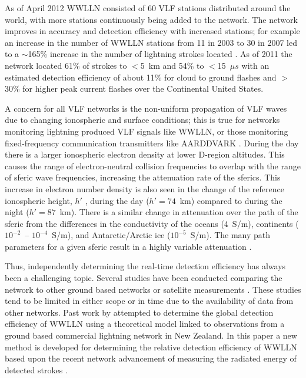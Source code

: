 \documentclass[draft,ras]{agutex}
\begin{document}
\begin{article}
As of April 2012 WWLLN consisted of 60 VLF stations distributed around the world, with more stations continuously being added to the network. The network improves in accuracy and detection efficiency with increased stations; for example an increase in the number of WWLLN stations from 11 in 2003 to 30 in 2007 led to a $\sim$165\% increase in the number of lightning strokes located \citep{Rodger2009}. As of 2011 the network located 61\% of strokes to $<$5~km and 54\% to $<$15~$\mu s$ with an estimated detection efficiency of about 11\% for cloud to ground flashes and $>$30\% for higher peak current flashes over the Continental United States\citep{Hutchins2012c, Abarca2010, Rodger2009}.

A concern for all VLF networks is the non-uniform propagation of VLF waves due to changing ionospheric  and surface conditions; this is true for networks monitoring lightning produced VLF signals like WWLLN, or those monitoring fixed-frequency communication transmitters like AARDDVARK \citep{Clilverd2009}. During the day there is a larger ionospheric electron density at lower D-region altitudes. This causes the range of electron-neutral collision frequencies to overlap with the range of sferic wave frequencies, increasing the attenuation rate of the sferics. This increase in electron number density is also seen in the change of the reference ionospheric height, $h'$ \citep{Wait1960a}, during the day ($h'=74$~km) compared to during the night ($h'=87$~km). There is a similar change in attenuation over the path of the sferic from the differences in the conductivity of the oceans (4~S/m), continents ($10^{-2}$~-- $10^{-4}$~S/m), and Antarctic/Arctic ice ($10^{-5}$~S/m). The many path parameters for a given sferic result in a highly variable attenuation \citep{Volland1995}.

Thus, independently determining the real-time detection efficiency has always been a challenging topic. Several studies have been conducted comparing the network to other ground based networks or satellite measurements \citep{Lay2004b, Jacobson2006c, Rodger2009, Abarca2010, Abreu2010}. These studies tend to be limited in either scope or in time due to the availability of data from other networks. Past work by \citet{Rodger2006} attempted to determine the global detection efficiency of WWLLN using a theoretical model linked to observations from a ground based commercial lightning network in New Zealand. In this paper a new method is developed for determining  the relative detection efficiency of WWLLN based upon the recent network advancement of measuring the radiated energy of detected strokes \citep{Hutchins2012}.


\end{article}
\end{document}

